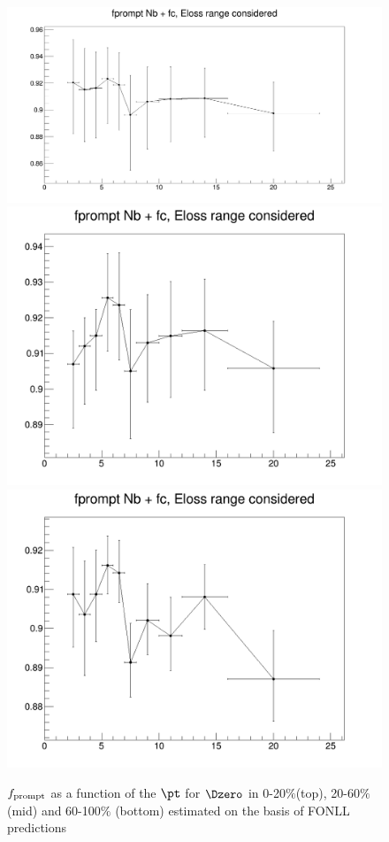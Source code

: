 \begin{figure}
\centering
\includegraphics[width=0.6\linewidth]{figuresVsCent/Dzero/EffAndFeed/fPrompt_Final_Nb_020.png
}
\includegraphics[width=0.6\linewidth]{figuresVsCent/Dzero/EffAndFeed/fPrompt_Final_Nb_2060.png
}
\includegraphics[width=0.6\linewidth]{figuresVsCent/Dzero/EffAndFeed/fPrompt_Final_Nb_60100.png
}
\caption{$f_{\rm prompt}$ as a function of the $\pt$ for $\Dzero$ in 0-20$\%$(top), 20-60$\%$ (mid) and 60-100$\%$ (bottom) estimated on the basis of FONLL predictions}
\label{fpromptDzero}
\end{figure}

